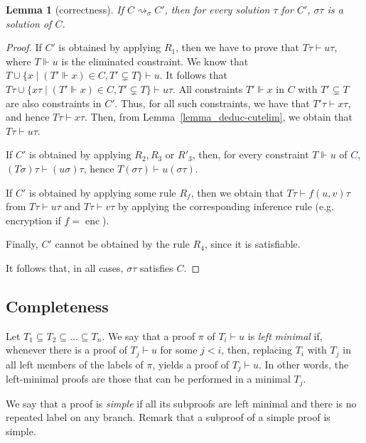 \documentclass[acmtocl,acmnow]{acmtrans2m}
\newtheorem{lemma}[theorem]{Lemma}
\newcommand{\set}[1]{\lbrace{#1}\rbrace}
\newcommand{\enc}{\operatorname{enc}}
\newcommand{\simpl}{\rightsquigarrow}   \newcommand{\msimpl}{\rightsquigarrow}  \newcommand{\gsimpl}{\leadsto}
\begin{document}
\begin{lemma}[correctness]\label{lemma_correct}\label{lemma:correctness}
If $C\simpl_\sigma C'$, then for every solution $\tau$ for
$C'$, $\sigma\tau$ is a solution of $C$.
\end{lemma}
\begin{proof}
If $C'$ is obtained by applying $R_1$, then we have to prove that $T\tau \vdash u\tau$, where $T\Vdash u$ is the
eliminated constraint.
We know that $T\cup\set{x\mid (T'\Vdash x)\in C, T'\subsetneq T}\vdash u$. It
follows that $T\tau\cup\set{x\tau\mid (T'\Vdash x)\in C, T'\subsetneq T}\vdash u\tau$. 
All constraints $T'\Vdash x$ in $C$ with $T'\subsetneq T$ are also constraints in $C'$.
Thus, for all such constraints, we have that $T'\tau\vdash x\tau$, and hence $T\tau\vdash x\tau$.
Then, from Lemma~\ref{lemma_deduc-cutelim}, we obtain that $T\tau \vdash u\tau$.

If $C'$ is obtained by applying  $R_2,R_3$ or
$R'_3$, then, for every constraint $T\Vdash u$ of $C$,
$(T\sigma)\tau\vdash (u\sigma)\tau$, hence $T(\sigma\tau)\vdash
u(\sigma\tau)$. 

If $C'$ is obtained by applying some rule $R_f$, then we obtain that $T\tau
\vdash f(u,v)\tau$ from $T\tau \vdash u\tau$ and $T\tau\vdash v\tau$
by applying the corresponding inference rule (e.g. encryption if $f=\enc$).

Finally, $C'$ cannot be obtained by the rule $R_4$, since it is satisfiable.

It follows that, in all cases,
 $\sigma\tau$ satisfies $C$. 
\end{proof}



\subsection{Completeness}\label{app:complet}

Let $T_1\subseteq T_2\subseteq \dots \subseteq T_n$. We say that a proof $\pi$ of $T_i\vdash u$ is
\emph{left minimal} if, whenever
there is a proof of $T_j \vdash u$ for some $j < i$, then, replacing
$T_i$ with $T_j$ in all left members of the labels of $\pi$, yields
a proof of $T_j\vdash u$. In other words, the left-minimal proofs are 
those that can be performed in a minimal $T_j$.

We
say that a proof is \emph{simple} if all its subproofs are left minimal and 
there is no repeated label on any branch.
 Remark that a subproof of a simple proof is simple.
\end{document}
